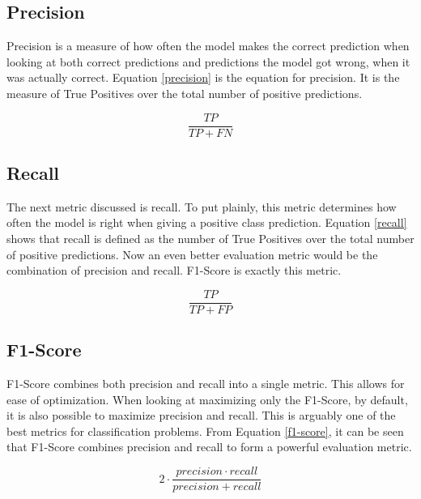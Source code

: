 \subsection{Precision}
\hspace{0.5in}Precision is a measure of how often the model makes the correct prediction when looking at both correct predictions and predictions the model got wrong, when it was actually correct. Equation \ref{precision} is the equation for precision. It is the measure of True Positives over the total number of positive predictions.
\begin{center}
    \begin{equation}
    \label{precision}
        \frac{TP}{TP+FN}
    \end{equation}
\end{center}

\subsection{Recall}
\hspace{0.5in}The next metric discussed is recall. To put plainly, this metric determines how often the model is right when giving a positive class prediction. Equation \ref{recall} shows that recall is defined as the number of True Positives over the total number of positive predictions. Now an even better evaluation metric would be the combination of precision and recall. F1-Score is exactly this metric.

\begin{center}
    \begin{equation}
    \label{recall}
       \frac{TP}{TP+FP}
    \end{equation}
\end{center}

\subsection{F1-Score}
\hspace{0.5in}F1-Score combines both precision and recall into a single metric. This allows for ease of optimization. When looking at maximizing only the F1-Score, by default, it is also possible to maximize precision and recall. This is arguably one of the best metrics for classification problems. From Equation \ref{f1-score}, it can be seen that F1-Score combines precision and recall to form a powerful evaluation metric.
\begin{center}
    \begin{equation}
    \label{f1-score}
        2 \cdot \frac{precision \cdot recall}{precision + recall}
    \end{equation}
\end{center}

